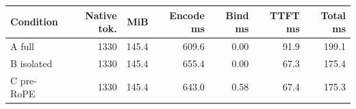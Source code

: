 \begin{tabular}{lrrrrrr}
\toprule
Condition & Native tok. & MiB & Encode ms & Bind ms & TTFT ms & Total ms \\
\midrule
A full & 1330 & 145.4 & 609.6 & 0.00 & 91.9 & 199.1 \\
B isolated & 1330 & 145.4 & 655.4 & 0.00 & 67.3 & 175.4 \\
C pre-RoPE & 1330 & 145.4 & 643.0 & 0.58 & 67.4 & 175.3 \\
\bottomrule
\end{tabular}

